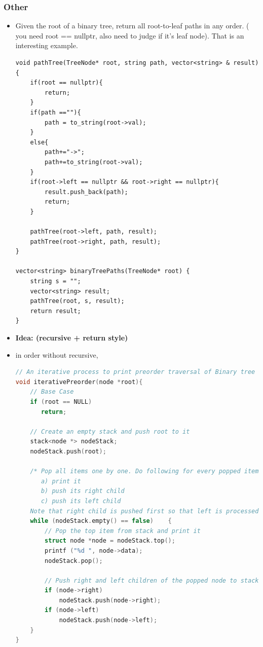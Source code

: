 \documentclass[a4paper,11pt,twoside]{book}
\begin{document}
\subsubsection{Other}
\begin{itemize}
	
	
\item Given the root of a binary tree, return all root-to-leaf paths in any order. ( you need root == nullptr, also need to judge if it's leaf node). 
That is an interesting example. 

\begin{lstlisting}
void pathTree(TreeNode* root, string path, vector<string> & result){
	if(root == nullptr){
		return;
	}
	if(path ==""){
		path = to_string(root->val);
	}
	else{
		path+="->";
		path+=to_string(root->val);
	}
	if(root->left == nullptr && root->right == nullptr){
		result.push_back(path);
		return;
	}
	
	pathTree(root->left, path, result);
	pathTree(root->right, path, result);
}

vector<string> binaryTreePaths(TreeNode* root) {
	string s = "";
	vector<string> result;
	pathTree(root, s, result);
	return result;
}
\end{lstlisting}


\item \textbf{Idea: (recursive + return style)}

\item in order without recursive, 
\begin{lstlisting}[frame=single, language=c++]
// An iterative process to print preorder traversal of Binary tree
void iterativePreorder(node *root){
    // Base Case
    if (root == NULL)
       return;
 
    // Create an empty stack and push root to it
    stack<node *> nodeStack;
    nodeStack.push(root);
 
    /* Pop all items one by one. Do following for every popped item
       a) print it
       b) push its right child
       c) push its left child
    Note that right child is pushed first so that left is processed first */
    while (nodeStack.empty() == false)    {
        // Pop the top item from stack and print it
        struct node *node = nodeStack.top();
        printf ("%d ", node->data);
        nodeStack.pop();
 
        // Push right and left children of the popped node to stack
        if (node->right)
            nodeStack.push(node->right);
        if (node->left)
            nodeStack.push(node->left);
    }
}
\end{lstlisting}


\end{itemize}
\end{document}
